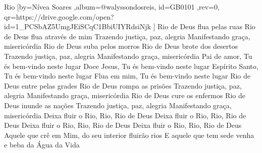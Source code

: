 \beginsong
{Rio %
}[by={Nívea Soares %
},album={@walyssondosreis},
id={GB0101 %
},rev={0}, %
qr={https://drive.google.com/open?id=1_PCSbAZ5UmgJEiSCqC1BbiUIYRdsiNjk %
}]
\beginverse*
Rio de Deus flua pelas ruas
Rio de Deus flua através de mim
Trazendo justiça, paz, alegria
Manifestando graça, misericórdia
\endverse
\beginverse*
Rio de Deus suba pelos morros
Rio de Deus brote dos desertos
Trazendo justiça, paz, alegria
Manifestando graça, misericórdia
\endverse
\beginchorus
Pai de amor, Tu és bem-vindo neste lugar
Doce Jesus, Tu és bem-vindo neste lugar
Espírito Santo, Tu és bem-vindo neste lugar
Flua em mim, Tu és bem-vindo neste lugar
\endchorus
\beginverse*
Rio de Deus entre pelas grades
Rio de Deus rompa as prisões
Trazendo justiça, paz, alegria
Manifestando graça, misericórdia
\endverse
\beginverse*
Rio de Deus cure os enfermos
Rio de Deus inunde as nações
Trazendo justiça, paz, alegria
Manifestando graça, misericórdia
\endverse
\beginverse*
Deixa fluir o Rio, Rio, Rio de Deus
Deixa fluir o Rio, Rio, Rio de Deus
Deixa fluir o Rio, Rio, Rio de Deus
Deixa fluir o Rio, Rio, Rio de Deus
\endverse
\beginverse*
Aquele que crê em Mim, do seu interior fluirão rios
E aquele que tem sede venha e beba da Água da Vida
\endverse
\vspace{4em} %
\begin{comment}
\lstset{basicstyle=\scriptsize\bf} %
\tab{Solo 1}
\begin{lstlisting}
E|-----------------------------------------------------|
B|-----------------------------------------------------|
G|-----------------------------------------------------|
D|-----------------------------------------------------|
A|-----------------------------------------------------|
E|-----------------------------------------------------|
\end{lstlisting}
\end{comment}
 
